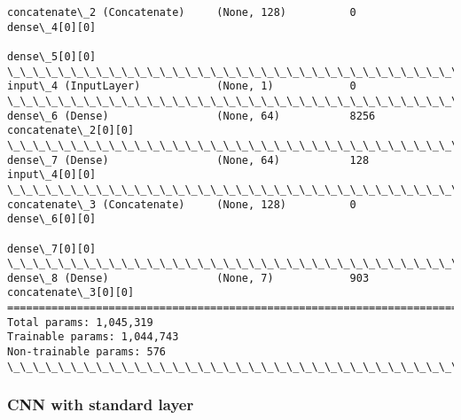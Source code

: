 \documentclass[11pt]{article}
\begin{document}
\begin{Verbatim}[commandchars=\\\{\}]
concatenate\_2 (Concatenate)     (None, 128)          0           dense\_4[0][0]                    
                                                                 dense\_5[0][0]                    
\_\_\_\_\_\_\_\_\_\_\_\_\_\_\_\_\_\_\_\_\_\_\_\_\_\_\_\_\_\_\_\_\_\_\_\_\_\_\_\_\_\_\_\_\_\_\_\_\_\_\_\_\_\_\_\_\_\_\_\_\_\_\_\_\_\_\_\_\_\_\_\_\_\_\_\_\_\_\_\_\_\_\_\_\_\_\_\_\_\_\_\_\_\_\_\_\_\_
input\_4 (InputLayer)            (None, 1)            0                                            
\_\_\_\_\_\_\_\_\_\_\_\_\_\_\_\_\_\_\_\_\_\_\_\_\_\_\_\_\_\_\_\_\_\_\_\_\_\_\_\_\_\_\_\_\_\_\_\_\_\_\_\_\_\_\_\_\_\_\_\_\_\_\_\_\_\_\_\_\_\_\_\_\_\_\_\_\_\_\_\_\_\_\_\_\_\_\_\_\_\_\_\_\_\_\_\_\_\_
dense\_6 (Dense)                 (None, 64)           8256        concatenate\_2[0][0]              
\_\_\_\_\_\_\_\_\_\_\_\_\_\_\_\_\_\_\_\_\_\_\_\_\_\_\_\_\_\_\_\_\_\_\_\_\_\_\_\_\_\_\_\_\_\_\_\_\_\_\_\_\_\_\_\_\_\_\_\_\_\_\_\_\_\_\_\_\_\_\_\_\_\_\_\_\_\_\_\_\_\_\_\_\_\_\_\_\_\_\_\_\_\_\_\_\_\_
dense\_7 (Dense)                 (None, 64)           128         input\_4[0][0]                    
\_\_\_\_\_\_\_\_\_\_\_\_\_\_\_\_\_\_\_\_\_\_\_\_\_\_\_\_\_\_\_\_\_\_\_\_\_\_\_\_\_\_\_\_\_\_\_\_\_\_\_\_\_\_\_\_\_\_\_\_\_\_\_\_\_\_\_\_\_\_\_\_\_\_\_\_\_\_\_\_\_\_\_\_\_\_\_\_\_\_\_\_\_\_\_\_\_\_
concatenate\_3 (Concatenate)     (None, 128)          0           dense\_6[0][0]                    
                                                                 dense\_7[0][0]                    
\_\_\_\_\_\_\_\_\_\_\_\_\_\_\_\_\_\_\_\_\_\_\_\_\_\_\_\_\_\_\_\_\_\_\_\_\_\_\_\_\_\_\_\_\_\_\_\_\_\_\_\_\_\_\_\_\_\_\_\_\_\_\_\_\_\_\_\_\_\_\_\_\_\_\_\_\_\_\_\_\_\_\_\_\_\_\_\_\_\_\_\_\_\_\_\_\_\_
dense\_8 (Dense)                 (None, 7)            903         concatenate\_3[0][0]              
==================================================================================================
Total params: 1,045,319
Trainable params: 1,044,743
Non-trainable params: 576
\_\_\_\_\_\_\_\_\_\_\_\_\_\_\_\_\_\_\_\_\_\_\_\_\_\_\_\_\_\_\_\_\_\_\_\_\_\_\_\_\_\_\_\_\_\_\_\_\_\_\_\_\_\_\_\_\_\_\_\_\_\_\_\_\_\_\_\_\_\_\_\_\_\_\_\_\_\_\_\_\_\_\_\_\_\_\_\_\_\_\_\_\_\_\_\_\_\_

    \end{Verbatim}

    \hypertarget{cnn-with-standard-layer}{%
\subsubsection{CNN with standard layer}\label{cnn-with-standard-layer}}
\end{document}
